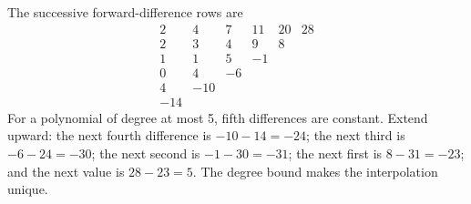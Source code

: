 The successive forward-difference rows are\[\begin{array}{rrrrrr}2&4&7&11&20&28\\2&3&4&9&8\\1&1&5&-1\\0&4&-6\\4&-10\\-14\end{array}\]For a polynomial of degree at most 5, fifth differences are constant. Extend upward: the next fourth difference is $-10-14=-24$; the next third is $-6-24=-30$; the next second is $-1-30=-31$; the next first is $8-31=-23$; and the next value is $28-23=\boxed5$. The degree bound makes the interpolation unique.

